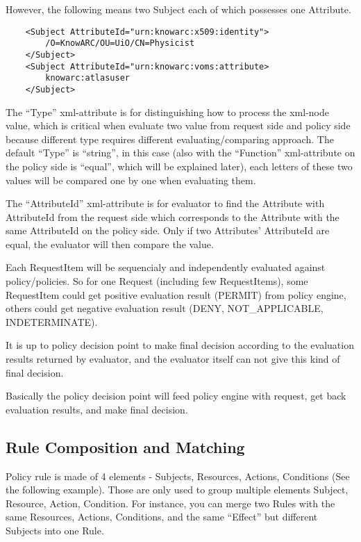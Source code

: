 \documentclass{book}
\begin{document}
However, the following means two Subject each of which possesses one Attribute.

\begin{verbatim}
    <Subject AttributeId="urn:knowarc:x509:identity">
        /O=KnowARC/OU=UiO/CN=Physicist
    </Subject>
    <Subject AttributeId="urn:knowarc:voms:attribute>
        knowarc:atlasuser
    </Subject>
\end{verbatim}

The ``Type'' xml-attribute is for distinguishing how to process the xml-node value, which is critical when evaluate two value from request side and policy side because different type requires different evaluating/comparing approach. The default ``Type'' is ``string'', in this case (also with the ``Function'' xml-attribute on the policy side is ``equal'', which will be explained later), each letters of these two values will be compared one by one when evaluating them.

The ``AttributeId'' xml-attribute is for evaluator to find the Attribute with AttributeId from the request side which corresponds to the Attribute with the same AttributeId on the policy side. Only if two Attributes' AttributeId are equal, the evaluator will then compare the value.

Each RequestItem will be sequencialy and independently evaluated against policy/policies. So for one Request (including few RequestItems), some RequestItem could get positive evaluation result (PERMIT) from policy engine, others could get negative evaluation result (DENY, NOT\_APPLICABLE, INDETERMINATE).

It is up to policy decision point to make final decision according to the evaluation results returned by evaluator, and the evaluator itself can not give this kind of final decision.

Basically the policy decision point will feed policy engine with request, get back evaluation results, 
and make final decision.


\subsection{Rule Composition and Matching} %
\label{subsec:rule_comp_match}

Policy rule is made of 4 elements - Subjects, Resources, Actions, Conditions (See the following example). Those are only used to group multiple elements Subject, Resource, Action, Condition. For instance, you can merge two Rules with the same Resources, Actions, Conditions, and the same ``Effect'' but different Subjects into one Rule.
\end{document}
